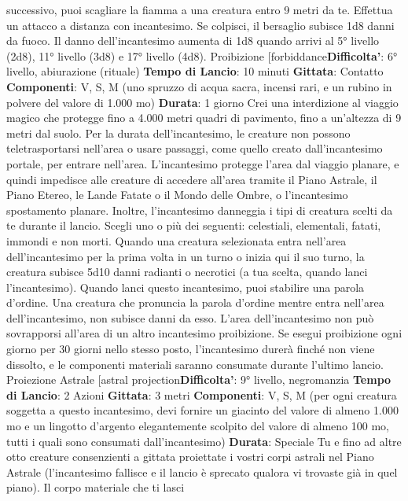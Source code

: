 \begin{multicols}{2}
successivo, puoi scagliare la fiamma a una creatura
entro 9 metri da te. Effettua un attacco a distanza con
incantesimo. Se colpisci, il bersaglio subisce 1d8 danni
da fuoco.
Il danno dell’incantesimo aumenta di 1d8 quando arrivi
al 5° livello (2d8), 11° livello (3d8) e 17° livello (4d8).
Proibizione
[forbiddance\textbf{Difficolta'}:
6° livello, abiurazione (rituale)
\textbf{Tempo di Lancio}: 10 minuti
\textbf{Gittata}: Contatto
\textbf{Componenti}: V, S, M (uno spruzzo di acqua sacra,
incensi rari, e un rubino in polvere del valore di 1.000
mo)
\textbf{Durata}: 1 giorno
Crei una interdizione al viaggio magico che protegge
fino a 4.000 metri quadri di pavimento, fino a un’altezza
di 9 metri dal suolo. Per la durata dell’incantesimo, le
creature non possono teletrasportarsi nell’area o usare
passaggi, come quello creato dall’incantesimo portale,
per entrare nell’area. L’incantesimo protegge l’area dal
viaggio planare, e quindi impedisce alle creature di
accedere all’area tramite il Piano Astrale, il Piano
Etereo, le Lande Fatate o il Mondo delle Ombre, o
l’incantesimo spostamento planare.
Inoltre, l’incantesimo danneggia i tipi di creatura scelti
da te durante il lancio. Scegli uno o più dei seguenti:
celestiali, elementali, fatati, immondi e non morti.
Quando una creatura selezionata entra nell’area
dell’incantesimo per la prima volta in un turno o inizia
qui il suo turno, la creatura subisce 5d10 danni radianti
o necrotici (a tua scelta, quando lanci l’incantesimo).
Quando lanci questo incantesimo, puoi stabilire una
parola d’ordine. Una creatura che pronuncia la parola
d’ordine mentre entra nell’area dell’incantesimo, non
subisce danni da esso.
L’area dell’incantesimo non può sovrapporsi all’area di
un altro incantesimo proibizione. Se esegui proibizione
ogni giorno per 30 giorni nello stesso posto,
l’incantesimo durerà finché non viene dissolto, e le
componenti materiali saranno consumate durante
l’ultimo lancio.
Proiezione Astrale
[astral projection\textbf{Difficolta'}:
9° livello, negromanzia
\textbf{Tempo di Lancio}: 2 Azioni
\textbf{Gittata}: 3 metri
\textbf{Componenti}: V, S, M (per ogni creatura soggetta a
questo incantesimo, devi fornire un giacinto del valore
di almeno 1.000 mo e un lingotto d’argento
elegantemente scolpito del valore di almeno 100 mo,
tutti i quali sono consumati dall’incantesimo)
\textbf{Durata}: Speciale
Tu e fino ad altre otto creature consenzienti a gittata
proiettate i vostri corpi astrali nel Piano Astrale
(l’incantesimo fallisce e il lancio è sprecato qualora vi
trovaste già in quel piano). Il corpo materiale che ti lasci

\end{multicols}
